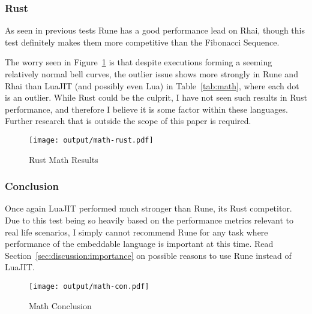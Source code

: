 \subsubsection{Rust}
As seen in previous tests Rune has a good performance lead on Rhai, though this test definitely makes them more competitive than the Fibonacci Sequence.

The worry seen in Figure~\ref{fig:math-rust} is that despite executions forming a seeming relatively normal bell curves, the outlier issue shows more strongly in Rune and Rhai than LuaJIT (and possibly even Lua) in Table~\ref{tab:math}, where each dot is an outlier. While Rust could be the culprit, I have not seen such results in Rust performance, and therefore I believe it is some factor within these languages. Further research that is outside the scope of this paper is required.

\begin{figure}[H]
	\centering
		\texttt{[image: output/math-rust.pdf]}
	\caption{Rust Math Results}
	\label{fig:math-rust}
\end{figure}

\subsubsection{Conclusion}
Once again LuaJIT performed much stronger than Rune, its Rust competitor. Due to this test being so heavily based on the performance metrics relevant to real life scenarios, I simply cannot recommend Rune for any task where performance of the embeddable language is important at this time. Read Section~\ref{sec:discussion:importance} on possible reasons to use Rune instead of LuaJIT.

\begin{figure}[H]
	\centering
		\texttt{[image: output/math-con.pdf]}
	\caption{Math Conclusion}
	\label{fig:math-con}
\end{figure}
